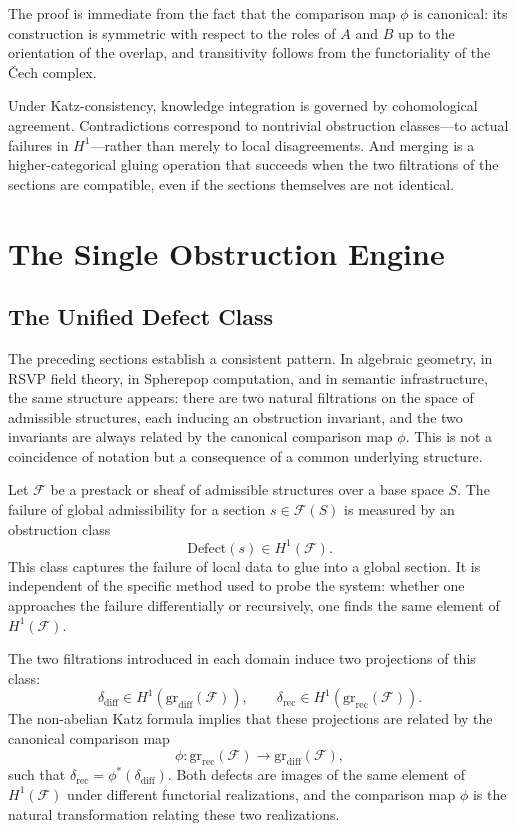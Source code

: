\documentclass[12pt]{article}
\begin{document}
The proof is immediate from the fact that the comparison map $\phi$ is canonical: its
construction is symmetric with respect to the roles of $A$ and $B$ up to the
orientation of the overlap, and transitivity follows from the functoriality of the
\v{C}ech complex.

Under Katz-consistency, knowledge integration is governed by cohomological agreement.
Contradictions correspond to nontrivial obstruction classes---to actual failures in
$H^1$---rather than merely to local disagreements. And merging is a higher-categorical
gluing operation that succeeds when the two filtrations of the sections are compatible,
even if the sections themselves are not identical.

\section{The Single Obstruction Engine}

\subsection{The Unified Defect Class}

The preceding sections establish a consistent pattern. In algebraic geometry, in RSVP
field theory, in Spherepop computation, and in semantic infrastructure, the same
structure appears: there are two natural filtrations on the space of admissible
structures, each inducing an obstruction invariant, and the two invariants are always
related by the canonical comparison map $\phi$. This is not a coincidence of notation
but a consequence of a common underlying structure.

Let $\mathcal{F}$ be a prestack or sheaf of admissible structures over a base space
$S$. The failure of global admissibility for a section $s \in \mathcal{F}(S)$ is
measured by an obstruction class
\[
\mathrm{Defect}(s) \in H^1(\mathcal{F}).
\]
This class captures the failure of local data to glue into a global section. It is
independent of the specific method used to probe the system: whether one approaches the
failure differentially or recursively, one finds the same element of $H^1(\mathcal{F})$.

The two filtrations introduced in each domain induce two projections of this class:
\[
\delta_{\mathrm{diff}} \in H^1(\mathrm{gr}_{\mathrm{diff}}(\mathcal{F})),
\qquad
\delta_{\mathrm{rec}} \in H^1(\mathrm{gr}_{\mathrm{rec}}(\mathcal{F})).
\]
The non-abelian Katz formula implies that these projections are related by the
canonical comparison map
\[
\phi : \mathrm{gr}_{\mathrm{rec}}(\mathcal{F}) \to \mathrm{gr}_{\mathrm{diff}}(\mathcal{F}),
\]
such that $\delta_{\mathrm{rec}} = \phi^*(\delta_{\mathrm{diff}})$. Both defects are
images of the same element of $H^1(\mathcal{F})$ under different functorial
realizations, and the comparison map $\phi$ is the natural transformation relating
these two realizations.
\end{document}
